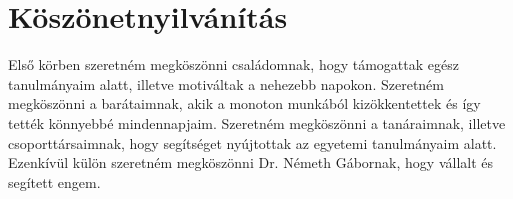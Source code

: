 \chapter*{Köszönetnyilvánítás}
Első körben szeretném megköszönni családomnak, hogy támogattak egész tanulmányaim alatt, illetve motiváltak a nehezebb napokon. Szeretném megköszönni a barátaimnak, akik a monoton munkából kizökkentettek és így tették könnyebbé mindennapjaim. Szeretném megköszönni a tanáraimnak, illetve csoporttársaimnak, hogy segítséget nyújtottak az egyetemi tanulmányaim alatt.
Ezenkívül külön szeretném megköszönni Dr. Németh Gábornak, hogy vállalt és segített engem.

\newpage